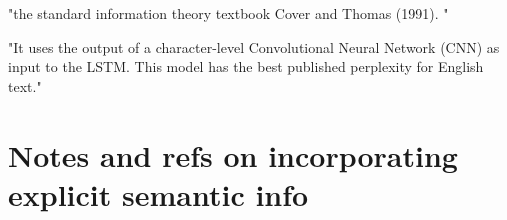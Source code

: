 "the standard information theory textbook Cover and Thomas (1991). "

"It uses the output of a character-level
Convolutional Neural Network (CNN) as input to
the LSTM. This model has the best published perplexity for English text." \citep{wilcox2018rnn}

\section{Notes and refs on incorporating explicit semantic info}





